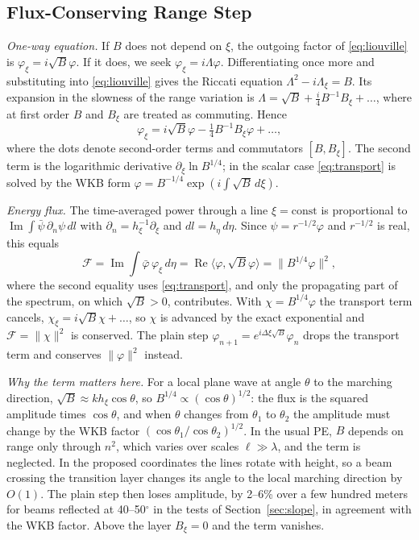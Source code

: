 \documentclass[journal]{IEEEtran}
\newcommand{\pd}{\partial}
\begin{document}
\subsection{Flux-Conserving Range Step}
\emph{One-way equation.} If $B$ does not depend on $\xi$, the outgoing factor
of \eqref{eq:liouville} is $\varphi_\xi=i\sqrt B\varphi$. If it does, we seek
$\varphi_\xi=i\Lambda\varphi$. Differentiating once more and substituting into
\eqref{eq:liouville} gives the Riccati equation $\Lambda^2-i\Lambda_\xi=B$. Its
expansion in the slowness of the range variation is $\Lambda=\sqrt B+\frac
i4B^{-1}B_\xi+\dots$, where at first order $B$ and $B_\xi$ are treated as
commuting. Hence
\begin{equation}\label{eq:transport}
\varphi_\xi=i\sqrt B\varphi-\tfrac14B^{-1}B_\xi\varphi+\dots,
\end{equation}
where the dots denote second-order terms and commutators $[B,B_\xi]$. The
second term is the logarithmic derivative $\pd_\xi\ln B^{1/4}$; in the scalar
case \eqref{eq:transport} is solved by the WKB form
$\varphi=B^{-1/4}\exp(i\int\sqrt B\,d\xi)$.

\emph{Energy flux.} The time-averaged power through a line $\xi=\text{const}$
is proportional to $\operatorname{Im}\int\bar\psi\,\pd_n\psi\,dl$ with
$\pd_n=h_\xi^{-1}\pd_\xi$ and $dl=h_\eta\,d\eta$. Since $\psi=r^{-1/2}\varphi$ and
$r^{-1/2}$ is real, this equals
\begin{equation}\label{eq:flux}
\mathcal F=\operatorname{Im}\int\bar\varphi\,\varphi_\xi\,d\eta
=\operatorname{Re}\langle\varphi,\sqrt B\varphi\rangle=\|B^{1/4}\varphi\|^2 ,
\end{equation}
where the second equality uses \eqref{eq:transport}, and only the propagating
part of the spectrum, on which $\sqrt B>0$, contributes. With
$\chi=B^{1/4}\varphi$ the transport term cancels, $\chi_\xi=i\sqrt B\chi+\dots$,
so $\chi$ is advanced by the exact exponential and $\mathcal F=\|\chi\|^2$ is
conserved. The plain step $\varphi_{n+1}=e^{i\Delta\xi\sqrt B}\varphi_n$ drops
the transport term and conserves $\|\varphi\|^2$ instead.

\emph{Why the term matters here.} For a local plane wave at angle $\theta$ to
the marching direction, $\sqrt B\approx kh_\xi\cos\theta$, so
$B^{1/4}\propto(\cos\theta)^{1/2}$: the flux is the squared amplitude times
$\cos\theta$, and when $\theta$ changes from $\theta_1$ to $\theta_2$ the
amplitude must change by the WKB factor $(\cos\theta_1/\cos\theta_2)^{1/2}$. In
the usual PE, $B$ depends on range only through $n^2$, which varies over scales
$\ell\gg\lambda$, and the term is neglected. In the proposed coordinates the
lines rotate with height, so a beam crossing the transition layer changes its
angle to the local marching direction by $O(1)$. The plain step then loses
amplitude, by 2--6\% over a few hundred meters for beams reflected at
40--50$^\circ$ in the tests of Section~\ref{sec:slope}, in agreement with the
WKB factor. Above the layer $B_\xi=0$ and the term vanishes.
\end{document}
